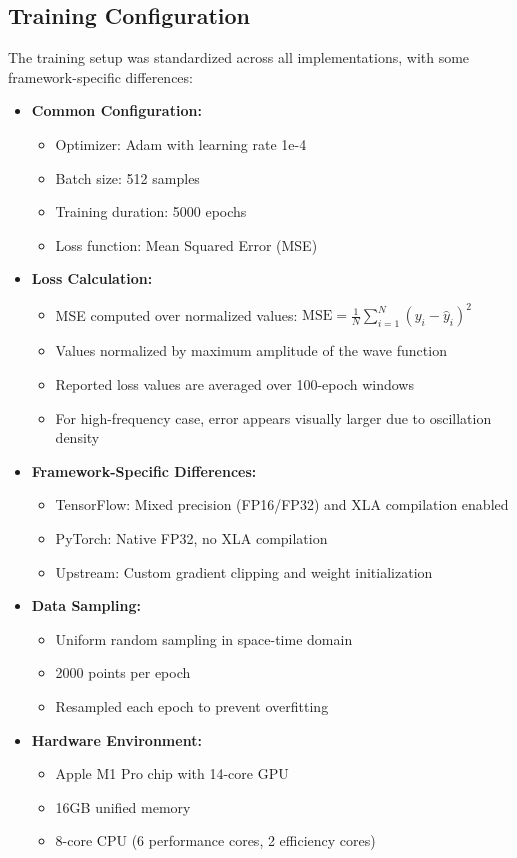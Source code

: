 \documentclass[10pt,journal,compsoc,onecolumn]{IEEEtran}
\begin{document}
\subsection{Training Configuration}
The training setup was standardized across all implementations, with some framework-specific differences:

\begin{itemize}
    \item \textbf{Common Configuration:}
    \begin{itemize}
        \item Optimizer: Adam with learning rate 1e-4
        \item Batch size: 512 samples
        \item Training duration: 5000 epochs
        \item Loss function: Mean Squared Error (MSE)
    \end{itemize}

    \item \textbf{Loss Calculation:}
    \begin{itemize}
        \item MSE computed over normalized values: $\text{MSE} = \frac{1}{N}\sum_{i=1}^N (y_i - \hat{y}_i)^2$
        \item Values normalized by maximum amplitude of the wave function
        \item Reported loss values are averaged over 100-epoch windows
        \item For high-frequency case, error appears visually larger due to oscillation density
    \end{itemize}

    \item \textbf{Framework-Specific Differences:}
    \begin{itemize}
        \item TensorFlow: Mixed precision (FP16/FP32) and XLA compilation enabled
        \item PyTorch: Native FP32, no XLA compilation
        \item Upstream: Custom gradient clipping and weight initialization
    \end{itemize}

    \item \textbf{Data Sampling:}
    \begin{itemize}
        \item Uniform random sampling in space-time domain
        \item 2000 points per epoch
        \item Resampled each epoch to prevent overfitting
    \end{itemize}

    \item \textbf{Hardware Environment:}
    \begin{itemize}
        \item Apple M1 Pro chip with 14-core GPU
        \item 16GB unified memory
        \item 8-core CPU (6 performance cores, 2 efficiency cores)
    \end{itemize}
\end{itemize}
\end{document}
